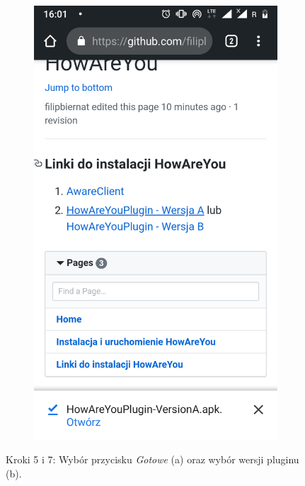 \begin{enumerate}
\begin{figure}[H]
\begin{subfigure}{0.35\textwidth}
			\subcaption{\label{subfigure_a}}
		\end{subfigure}
		\begin{subfigure}{0.35\textwidth}
			\centering
			\includegraphics[scale=0.14]{dodatekA/2_7.png}
			\subcaption{\label{subfigure_b}}
		\end{subfigure}
		\caption{ Kroki 5 i 7: Wybór przycisku \textit{Gotowe} (a) oraz wybór wersji pluginu (b).}
	\end{figure}
	\clearpage 
	

\end{enumerate}
